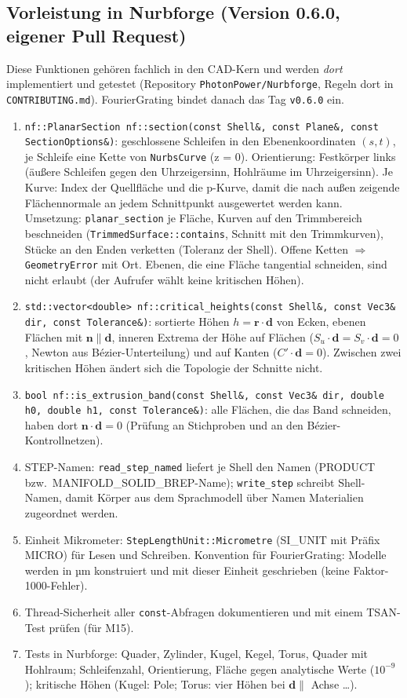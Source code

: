 \subsection{Vorleistung in Nurbforge (Version 0.6.0, eigener Pull Request)}
Diese Funktionen gehören fachlich in den CAD-Kern und werden \emph{dort} implementiert und getestet
(Repository \verb|PhotonPower/Nurbforge|, Regeln dort in \verb|CONTRIBUTING.md|). FourierGrating bindet danach das
Tag \verb|v0.6.0| ein.
\begin{enumerate}[nosep]
  \item \verb|nf::PlanarSection nf::section(const Shell&, const Plane&, const SectionOptions&)|:
        geschlossene Schleifen in den Ebenenkoordinaten $(s,t)$, je Schleife eine Kette von \verb|NurbsCurve|
        (z = 0). Orientierung: Festkörper links (äußere Schleifen gegen den Uhrzeigersinn, Hohlräume im Uhrzeigersinn).
        Je Kurve: Index der Quellfläche und die p-Kurve, damit die nach außen zeigende Flächennormale an jedem
        Schnittpunkt ausgewertet werden kann. Umsetzung: \verb|planar_section| je Fläche, Kurven auf den
        Trimmbereich beschneiden (\verb|TrimmedSurface::contains|, Schnitt mit den Trimmkurven), Stücke an den Enden
        verketten (Toleranz der Shell). Offene Ketten $\Rightarrow$ \verb|GeometryError| mit Ort.
        Ebenen, die eine Fläche tangential schneiden, sind nicht erlaubt (der Aufrufer wählt keine kritischen Höhen).
  \item \verb|std::vector<double> nf::critical_heights(const Shell&, const Vec3& dir, const Tolerance&)|:
        sortierte Höhen $h=\mathbf r\cdot\mathbf d$ von Ecken, ebenen Flächen mit $\mathbf n\parallel\mathbf d$, inneren
        Extrema der Höhe auf Flächen ($S_u\cdot\mathbf d=S_v\cdot\mathbf d=0$, Newton aus Bézier-Unterteilung) und auf
        Kanten ($C'\cdot\mathbf d=0$). Zwischen zwei kritischen Höhen ändert sich die Topologie der Schnitte nicht.
  \item \verb|bool nf::is_extrusion_band(const Shell&, const Vec3& dir, double h0, double h1, const Tolerance&)|:
        alle Flächen, die das Band schneiden, haben dort $\mathbf n\cdot\mathbf d=0$ (Prüfung an Stichproben und an
        den Bézier-Kontrollnetzen).
  \item STEP-Namen: \verb|read_step_named| liefert je Shell den Namen (PRODUCT bzw.\ MANIFOLD\_SOLID\_BREP-Name);
        \verb|write_step| schreibt Shell-Namen, damit Körper aus dem Sprachmodell über Namen Materialien zugeordnet werden.
  \item Einheit Mikrometer: \verb|StepLengthUnit::Micrometre| (SI\_UNIT mit Präfix MICRO) für Lesen und Schreiben. Konvention
        für FourierGrating: Modelle werden in µm konstruiert und mit dieser Einheit geschrieben (keine Faktor-1000-Fehler).
  \item Thread-Sicherheit aller \verb|const|-Abfragen dokumentieren und mit einem TSAN-Test prüfen (für M15).
  \item Tests in Nurbforge: Quader, Zylinder, Kugel, Kegel, Torus, Quader mit Hohlraum; Schleifenzahl, Orientierung,
        Fläche gegen analytische Werte ($10^{-9}$); kritische Höhen (Kugel: Pole; Torus: vier Höhen bei
        $\mathbf d\parallel$ Achse \dots).
\end{enumerate}

